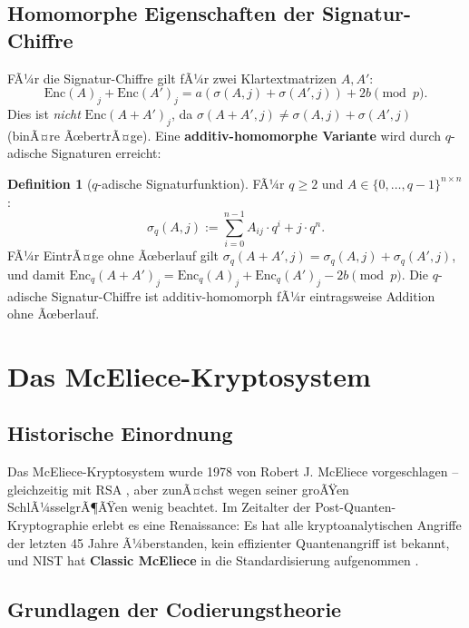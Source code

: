 ﻿\documentclass[a4paper,12pt]{scrreprt}
\theoremstyle{definition}
\newtheorem{definition}{Definition}[section]
\begin{document}
\subsection{Homomorphe Eigenschaften der Signatur-Chiffre}

FÃ¼r die Signatur-Chiffre gilt fÃ¼r zwei Klartextmatrizen $A, A'$:
\[
\mathrm{Enc}(A)_j + \mathrm{Enc}(A')_j = a(\sigma(A,j) + \sigma(A',j)) + 2b \pmod{p}.
\]
Dies ist \emph{nicht} $\mathrm{Enc}(A+A')_j$, da $\sigma(A+A',j) \neq \sigma(A,j)+\sigma(A',j)$ (binÃ¤re ÃœbertrÃ¤ge). Eine \textbf{additiv-homomorphe Variante} wird durch $q$-adische Signaturen erreicht:

\begin{definition}[$q$-adische Signaturfunktion]\label{def:qadic}
FÃ¼r $q \geq 2$ und $A \in \{0,\ldots,q-1\}^{n \times n}$:
\[
\sigma_q(A, j) := \sum_{i=0}^{n-1} A_{ij} \cdot q^i + j \cdot q^n.
\]
FÃ¼r EintrÃ¤ge ohne Ãœberlauf gilt $\sigma_q(A+A',j) = \sigma_q(A,j) + \sigma_q(A',j)$, und damit $\mathrm{Enc}_q(A+A')_j = \mathrm{Enc}_q(A)_j + \mathrm{Enc}_q(A')_j - 2b \pmod p$. Die $q$-adische Signatur-Chiffre ist additiv-homomorph fÃ¼r eintragsweise Addition ohne Ãœberlauf.
\end{definition}

\section{Das McEliece-Kryptosystem}

\subsection{Historische Einordnung}

Das McEliece-Kryptosystem wurde 1978 von Robert J. McEliece \cite{McE78} vorgeschlagen -- gleichzeitig mit RSA \cite{Riv78}, aber zunÃ¤chst wegen seiner groÃŸen SchlÃ¼sselgrÃ¶ÃŸen wenig beachtet. Im Zeitalter der Post-Quanten-Kryptographie erlebt es eine Renaissance: Es hat alle kryptoanalytischen Angriffe der letzten 45 Jahre Ã¼berstanden, kein effizienter Quantenangriff ist bekannt, und NIST hat \textbf{Classic McEliece} in die Standardisierung aufgenommen \cite{NIST22}.

\subsection{Grundlagen der Codierungstheorie}
\end{document}
